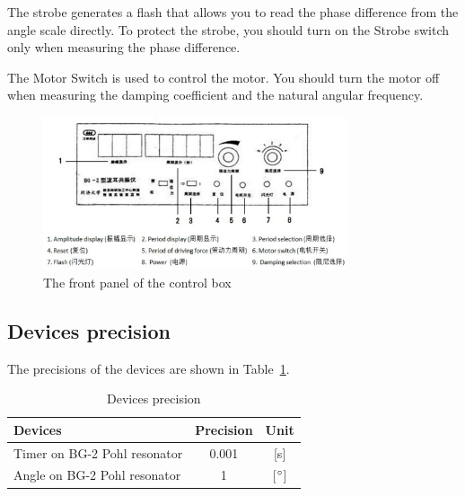 The strobe generates a flash that allows you to read the phase difference from
the angle scale directly.
To protect the strobe, you should turn on the Strobe switch only when measuring
the phase difference.

The Motor Switch is used to control the motor.
You should turn the motor off when measuring the damping coefficient and the
natural angular frequency.

\begin{figure}[H]
\centering
\includegraphics[width=0.8\textwidth]{fig/es3}
\caption{The front panel of the control box}
\label{panel}
\end{figure}

\subsection{Devices precision}
The precisions of the devices are shown in Table~\ref{precision}.

\begin{table}[H]
\centering
\begin{tabular}{|l|c|c|}
\hline
Devices & Precision & Unit\\ \hline
Timer on BG-2 Pohl resonator & 0.001 & [s]\\ \hline
Angle on BG-2 Pohl resonator & 1 & [$^\circ$]\\ \hline
\end{tabular}
\caption{Devices precision}
\label{precision}
\end{table}